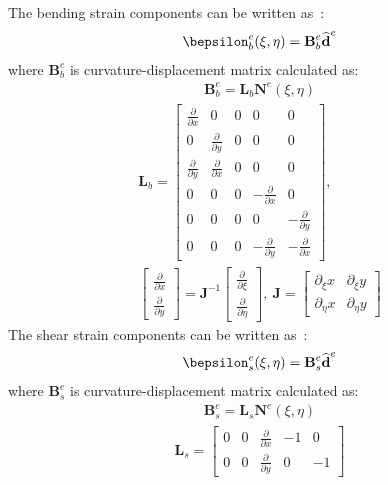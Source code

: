 \documentclass[a4paper,12pt]{article}
\begin{document}
The bending strain components can be written as~\cite{ferreira2008matlab}:
\begin{eqnarray}
\bepsilon_b^e(\xi,\eta)=\textbf{B}_b^e\widehat{\textbf{d}}^e
\end{eqnarray}
where $\textbf{B}_b^e$ is curvature-displacement matrix calculated as:
\begin{eqnarray}
\textbf{B}_b^e=\textbf{L}_b\textbf{N}^e(\xi,\eta)
\end{eqnarray}
\begin{eqnarray}
	\textbf{L}_b=\left [
	\begin{array}{ccccc}
		\frac{\partial }{\partial x} & 0 & 0 & 0 & 0\\
		0 & \frac{\partial }{\partial y} & 0 & 0 & 0\\
		\frac{\partial }{\partial y} & \frac{\partial }{\partial x} & 0 & 0 & 0\\
		0 & 0 & 0 & -\frac{\partial }{\partial x} & 0\\
		0 & 0 & 0 & 0 & -\frac{\partial }{\partial y}\\
		0 & 0 & 0 & -\frac{\partial }{\partial y} & -\frac{\partial }{\partial x}
	\end{array} \right],\ \\
  \left [
	\begin{array}{c}
		\frac{\partial }{\partial x}\\
		\frac{\partial }{\partial y}
	\end{array} \right] =\textbf{J}^{-1}
	\left [
	\begin{array}{c}
		\frac{\partial }{\partial \xi}\\
		\frac{\partial }{\partial \eta}
	\end{array} \right], \ 
	\textbf{J}=\left [
	\begin{array}{cc}
		\partial_\xi x & {\partial_\xi y} \\
		\partial_\eta x & {\partial_\eta y}
	\end{array} \right] \nonumber
\end{eqnarray}
The shear strain components can be written as~\cite{ferreira2008matlab}:
\begin{eqnarray}
\bepsilon_s^e(\xi,\eta)=\textbf{B}_s^e\widehat{\textbf{d}}^e
\end{eqnarray}
where $\textbf{B}_s^e$ is curvature-displacement matrix calculated as:
\begin{eqnarray}
\textbf{B}_s^e=\textbf{L}_s\textbf{N}^e(\xi,\eta)
\end{eqnarray}
\begin{eqnarray}
\textbf{L}_s=\left [
\begin{array}{ccccc}
0 & 0 & \frac{\partial }{\partial x} & -1 & 0 \\
0 & 0 & \frac{\partial }{\partial y} & 0 & -1
\end{array} \right]
\end{eqnarray}
\end{document}
